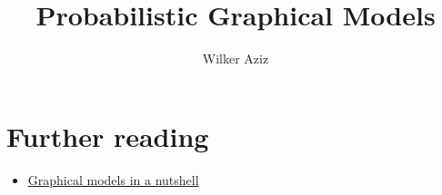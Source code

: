 \documentclass{article}
\title{Probabilistic Graphical Models}
\author{Wilker Aziz}
\begin{document}
\maketitle


\newpage




\section{Further reading}

\begin{itemize} 
	\item \href{https://homes.cs.washington.edu/~taskar/pubs/gms-srl07.pdf}{Graphical models in a nutshell}
\end{itemize}



\end{document}
